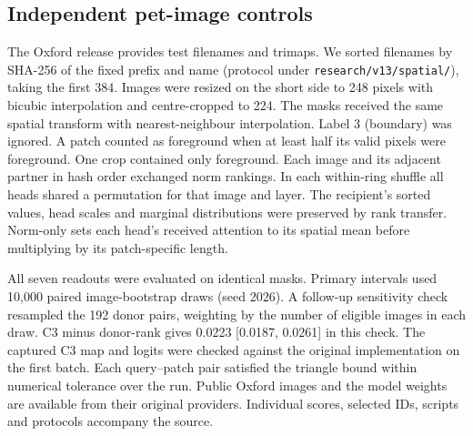 \subsection{Independent pet-image controls}
The Oxford release provides test filenames and trimaps. We sorted filenames by SHA-256 of the fixed prefix and name (protocol under \texttt{research/v13/spatial/}), taking the first 384. Images were resized on the short side to 248 pixels with bicubic interpolation and centre-cropped to 224. The masks received the same spatial transform with nearest-neighbour interpolation. Label 3 (boundary) was ignored. A patch counted as foreground when at least half its valid pixels were foreground. One crop contained only foreground. Each image and its adjacent partner in hash order exchanged norm rankings. In each within-ring shuffle all heads shared a permutation for that image and layer. The recipient's sorted values, head scales and marginal distributions were preserved by rank transfer. Norm-only sets each head's received attention to its spatial mean before multiplying by its patch-specific length.

All seven readouts were evaluated on identical masks. Primary intervals used 10,000 paired image-bootstrap draws (seed 2026). A follow-up sensitivity check resampled the 192 donor pairs, weighting by the number of eligible images in each draw. C3 minus donor-rank gives 0.0223 [0.0187, 0.0261] in this check. The captured C3 map and logits were checked against the original implementation on the first batch. Each query--patch pair satisfied the triangle bound within numerical tolerance over the run. Public Oxford images and the model weights are available from their original providers. Individual scores, selected IDs, scripts and protocols accompany the source.

